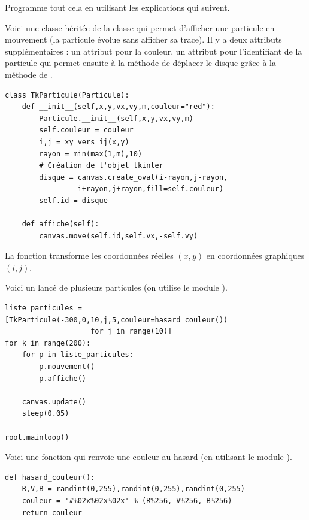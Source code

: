 \documentclass[11pt,class=report,crop=false]{standalone}
\begin{document}
\begin{activite}
Programme tout cela en utilisant les explications qui suivent.

\bigskip

Voici une classe  héritée de la classe  qui
permet d'afficher une particule en mouvement (la particule évolue sans afficher sa trace). 
Il y a deux attributs supplémentaires :
un attribut pour la couleur, un attribut pour l'identifiant  de la particule qui permet ensuite à la méthode  de déplacer le disque grâce à la méthode  de .

\begin{lstlisting}
class TkParticule(Particule):
    def __init__(self,x,y,vx,vy,m,couleur="red"):
        Particule.__init__(self,x,y,vx,vy,m)
        self.couleur = couleur
        i,j = xy_vers_ij(x,y)
        rayon = min(max(1,m),10)
        # Création de l'objet tkinter
        disque = canvas.create_oval(i-rayon,j-rayon,
                 i+rayon,j+rayon,fill=self.couleur)
        self.id = disque

    def affiche(self):
        canvas.move(self.id,self.vx,-self.vy)
\end{lstlisting}

La fonction  transforme les coordonnées réelles $(x,y)$ en coordonnées graphiques $(i,j)$.


Voici un lancé de plusieurs particules (on utilise le module ).
\begin{lstlisting}
liste_particules = [TkParticule(-300,0,10,j,5,couleur=hasard_couleur()) 
                    for j in range(10)]
for k in range(200):
    for p in liste_particules:
        p.mouvement()
        p.affiche()

    canvas.update()
    sleep(0.05)

root.mainloop()
\end{lstlisting}


Voici une fonction qui renvoie une couleur au hasard (en utilisant le module ).
\begin{lstlisting}
def hasard_couleur():
    R,V,B = randint(0,255),randint(0,255),randint(0,255)
    couleur = '#%02x%02x%02x' % (R%256, V%256, B%256)
    return couleur
\end{lstlisting}



\end{activite}
\end{document}
